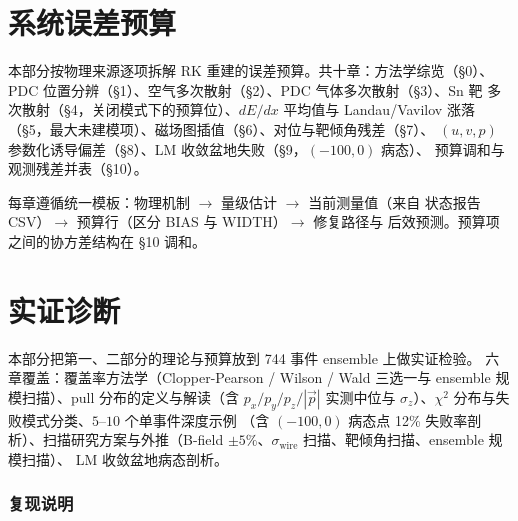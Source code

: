 \documentclass[a4paper, 11pt]{article}
\theoremstyle{plain}
\theoremstyle{definition}
\theoremstyle{remark}
\begin{document}
\newpage

\part{系统误差预算}\label{part:budget}

本部分按物理来源逐项拆解 RK 重建的误差预算。共十章：方法学综览（§0）、
PDC 位置分辨（§1）、空气多次散射（§2）、PDC 气体多次散射（§3）、Sn 靶
多次散射（§4，关闭模式下的预算位）、$dE/dx$ 平均值与 Landau/Vavilov 涨落
（§5，最大未建模项）、磁场图插值（§6）、对位与靶倾角残差（§7）、
$(u,v,p)$ 参数化诱导偏差（§8）、LM 收敛盆地失败（§9，$(-100,0)$ 病态）、
预算调和与观测残差并表（§10）。

每章遵循统一模板：物理机制 \(\to\) 量级估计 \(\to\) 当前测量值（来自
状态报告 CSV）\(\to\) 预算行（区分 BIAS 与 WIDTH）\(\to\) 修复路径与
后效预测。预算项之间的协方差结构在 §10 调和。





\newpage

\part{实证诊断}\label{part:diag}

本部分把第一、二部分的理论与预算放到 744 事件 ensemble 上做实证检验。
六章覆盖：覆盖率方法学（Clopper-Pearson / Wilson / Wald 三选一与 ensemble
规模扫描）、pull 分布的定义与解读（含 $p_x/p_y/p_z/|\vec p|$ 实测中位与
$\sigma_z$）、$\chi^2$ 分布与失败模式分类、$5\text{--}10$ 个单事件深度示例
（含 $(-100, 0)$ 病态点 12\% 失败率剖析）、扫描研究方案与外推（B-field
$\pm 5\%$、$\sigma_\mathrm{wire}$ 扫描、靶倾角扫描、ensemble 规模扫描）、
LM 收敛盆地病态剖析。



\newpage

\appendix

\section{复现说明}
\label{app:reproduce}
\end{document}
